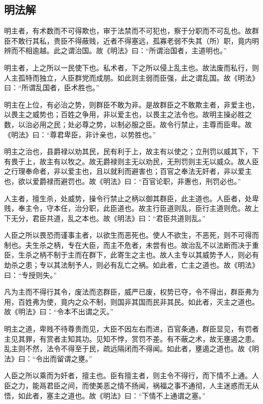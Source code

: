 \documentclass[]{article}
\begin{document}
\hypertarget{header-n909}{%
\subsection{明法解 }\label{header-n909}}

明主者，有术数而不可得欺也，审于法禁而不可犯也，察于分职而不可乱也。故群臣不敢行其私，贵臣不得蔽贱，近者不得塞远，孤寡老弱不失其（所）职，竟内明辨而不相逾越。此之谓治国。故《明法》曰：``所谓治国者，主道明也。''

明主者，上之所以一民使下也。私术者，下之所以侵上乱主也。故法废而私行，则人主孤特而独立，人臣群党而成朋。如此则主弱而臣强，此之谓乱国。故《明法》曰：``所谓乱国者，臣术胜也。''

明主在上位，有必治之势，则群臣不敢为非。是故群臣之不敢欺主者，非爱主也，以畏主之威势也；百姓之争用，非以爱主也，以畏主之法令也。故明主操必胜之数，以治必用之民；处必尊之势，以制必服之臣。故令行禁止，主尊而臣卑。故《明法》曰：``尊君卑臣，非计亲也，以势胜也。''

明主之治也，县爵禄以劝其民，民有利于上，故主有以使之；立刑罚以威其下，下有畏于上，故主有以牧之。故无爵禄则主无以劝民，无刑罚则主无以威众。故人臣之行理奉命者，非以爱主也，且以就利而避害也；百官之奉法无奸者，非以爱主也，欲以爱爵禄而避罚也。故《明法》曰：``百官论职，非惠也，刑罚必也。''

人主者，擅生杀，处威势，操令行禁止之柄以御其群臣，此主道也。人臣者，处卑贱，奉主令，守本任，治分职，此臣道也。故主行臣道则乱，臣行主道则危。故上下无分，君臣共道，乱之本也。故《明法》曰：``君臣共道则乱。''

人臣之所以畏恐而谨事主者，以欲生而恶死也。使人不欲生，不恶死，则不可得而制也。夫生杀之柄，专在大臣，而主不危者，未尝有也。故治乱不以法断而决于重臣，生杀之柄不制于主而在群下，此寄生之主也。故人主专以其威势予人，则必有劫杀之患；专以其法制予人，则必有乱亡之祸。如此者，亡主之道也。故《明法》曰：``专授则失。''

凡为主而不得行其令，废法而恣群臣，威严已废，权势已夺，令不得出，群臣弗为用，百姓弗为使，竟内之众不制，则国非其国而民非其民。如此者，灭主之道也。故《明法》曰：``令本不出谓之灭。''

明主之道，卑贱不待尊贵而见，大臣不因左右而进，百官条通，群臣显见，有罚者主见其罪，有赏者主知其功。见知不悖，赏罚不差。有不蔽之术，故无壅遏之患。乱主则不然，法令不得至于民，疏远隔闭而不得闻。如此者，壅遏之道也。故《明法》曰：``令出而留谓之壅。''

人臣之所以乘而为奸者，擅主也。臣有擅主者，则主令不得行，而下情不上通。人臣之力，能鬲君臣之间，而使美恶之情不扬闻，祸福之事不通彻，人主迷惑而无从悟，如此者，塞主之道也。故《明法》曰：``下情不上通谓之塞。''
\end{document}
